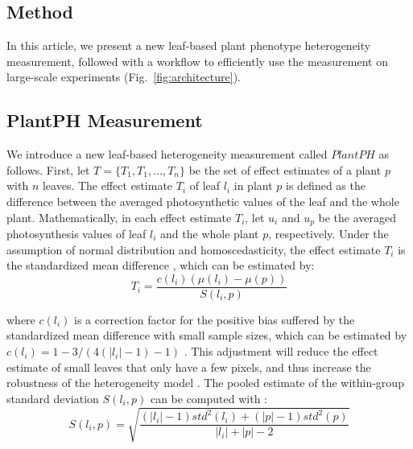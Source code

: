 \documentclass{bioinfo}
\begin{document}

\begin{methods}\vspace{-0.2in}
\section{Method}\label{sec:PlantPH}
In this article, we present a new leaf-based plant phenotype heterogeneity measurement, followed with a workflow to efficiently use the measurement on large-scale experiments (Fig.~\ref{fig:architecture}).

\subsection{PlantPH Measurement}
We introduce a new leaf-based heterogeneity measurement called $PlantPH$ as follows.
%
First, let $T = \{T_{1}, T_{1}, \ldots, T_{n}\}$ be the set of effect estimates of a plant $p$ with $n$ leaves.
The effect estimate $T_{i}$ of leaf $l_i$ in plant $p$ is defined as the difference between the averaged photosynthetic values of the leaf and  the whole plant.
%
Mathematically, in each effect estimate $T_i$, let $u_i$ and $u_p$ be the averaged photosynthesis values of leaf $l_i$ and the whole plant $p$, respectively. Under the assumption of normal distribution and homoscedasticity, the effect estimate $T_i$ is the standardized mean difference \citep{hedges1998fixed}, which can be estimated by: %
%
\begin{equation}\label{eq:effectestimate}
T_{i} =  \frac{c(l_i)\left(\mu(l_i)-\mu(p)\right)}{S(l_i,p)}
\end{equation}

\noindent where $c(l_i)$ is a correction factor for the positive bias suffered by the standardized mean difference with small sample sizes, which can be estimated by $c(l_i) = 1-3/(4(|l_i|-1)-1)$ \citep{hedge1985statistical}. This adjustment will reduce the effect estimate of small leaves that only have a few pixels, and thus increase the robustness of the heterogeneity model \citep{huedo2006assessing}.
%
%
The pooled estimate of the within-group standard deviation $S(l_i, p)$ can be computed with \citep{hedges1998fixed}:
%
\begin{equation}\label{eq:S}
S(l_i, p) = \sqrt{\frac{(|l_i|-1)std^2(l_i)+(|p|-1)std^2(p)}{|l_i|+|p|-2}}
\end{equation}


\end{methods}
\end{document}
